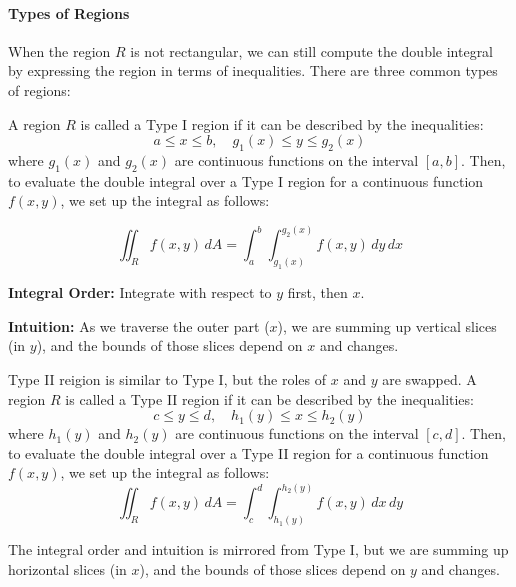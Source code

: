 \documentclass[11pt]{report}
\begin{document}
\paragraph{Types of Regions} When the region $R$ is not rectangular, we can still compute the double integral by expressing the region in terms of inequalities. There are three common types of regions:
\begin{definition}
    A region $R$ is called a Type I region if it can be described by the inequalities:
    $$
        a \le x \le b, \quad g_1(x) \le y \le g_2(x)
    $$
    where $g_1(x)$ and $g_2(x)$ are continuous functions on the interval $[a,b]$. Then, to evaluate the double integral over a Type I region for a continuous function $f(x,y)$, we set up the integral as follows:

    \begin{equation}
        \iint_R f(x,y) \, dA = \int_a^b \int_{g_1(x)}^{g_2(x)} f(x,y) \, dy \, dx
    \end{equation}

    \textbf{Integral Order:} Integrate with respect to $y$ first, then $x$.

    \textbf{Intuition:} As we traverse the outer part ($x$), we are summing up vertical slices (in $y$), and the bounds of those slices depend on $x$ and changes.
\end{definition}

\begin{definition}
    Type II reigion is similar to Type I, but the roles of $x$ and $y$ are swapped. A region $R$ is called a Type II region if it can be described by the inequalities:
    $$
        c \le y \le d, \quad h_1(y) \le x \le h_2(y)
    $$
    where $h_1(y)$ and $h_2(y)$ are continuous functions on the interval $[c,d]$. Then, to evaluate the double integral over a Type II region for a continuous function $f(x,y)$, we set up the integral as follows: 
    \begin{equation}
        \iint_R f(x,y) \, dA = \int_c^d \int_{h_1(y)}^{h_2(y)} f(x,y) \, dx \, dy
    \end{equation}

    The integral order and intuition is mirrored from Type I, but we are summing up horizontal slices (in $x$), and the bounds of those slices depend on $y$ and changes.
\end{definition}
\end{document}
